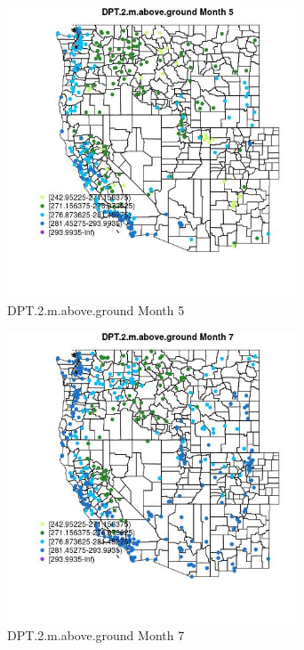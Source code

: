 \begin{figure} 
\centering  
\includegraphics[width=0.77\textwidth]{Code_Outputs/Report_ML_input_PM25_Step4_part_e_de_duplicated_aves_compiled_2019-05-18wNAs_MapObsMo5DPT2maboveground.jpg} 
\caption{\label{fig:Report_ML_input_PM25_Step4_part_e_de_duplicated_aves_compiled_2019-05-18wNAsMapObsMo5DPT2maboveground}DPT.2.m.above.ground Month 5} 
\end{figure} 
 

\begin{figure} 
\centering  
\includegraphics[width=0.77\textwidth]{Code_Outputs/Report_ML_input_PM25_Step4_part_e_de_duplicated_aves_compiled_2019-05-18wNAs_MapObsMo7DPT2maboveground.jpg} 
\caption{\label{fig:Report_ML_input_PM25_Step4_part_e_de_duplicated_aves_compiled_2019-05-18wNAsMapObsMo7DPT2maboveground}DPT.2.m.above.ground Month 7} 
\end{figure} 
 

